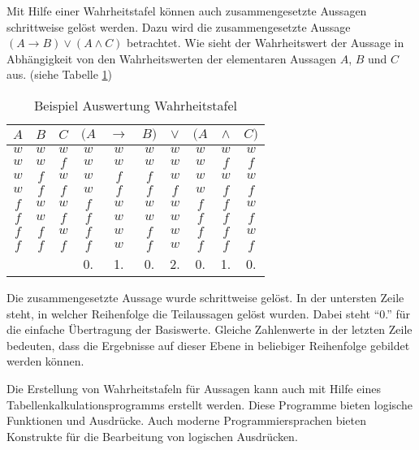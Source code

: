\begin{Unit}[Beispiel]
Mit Hilfe einer Wahrheitstafel können auch zusammengesetzte Aussagen 
schrittweise gelöst werden. Dazu wird die zusammengesetzte Aussage 
$(A \rightarrow B) \lor (A \land C)$ betrachtet. Wie sieht der Wahrheitswert 
der Aussage in Abhängigkeit von den Wahrheitswerten der elementaren Aussagen 
$A$, $B$ und $C$ aus. (siehe Tabelle 
\ref{tbl:Beispiel Auswertung Wahrheitstafel})

\begin{table}[htbp] 
\begin{center}
  \begin{tabular}{c|c|c||c|c|c|c|c|c|c|}
    $A$ & $B$ & $C$ & $(A$ & $\rightarrow$ & $B)$ & $\lor$ & $(A$ & $\land$ 
      & $C)$ \\ \hline
    $w$ & $w$ & $w$ & $w$ & $w$ & $w$ & $w$ & $w$ & $w$ & $w$ \\
    $w$ & $w$ & $f$ & $w$ & $w$ & $w$ & $w$ & $w$ & $f$ & $f$ \\
    $w$ & $f$ & $w$ & $w$ & $f$ & $f$ & $w$ & $w$ & $w$ & $w$ \\
    $w$ & $f$ & $f$ & $w$ & $f$ & $f$ & $f$ & $w$ & $f$ & $f$ \\
    $f$ & $w$ & $w$ & $f$ & $w$ & $w$ & $w$ & $f$ & $f$ & $w$ \\
    $f$ & $w$ & $f$ & $f$ & $w$ & $w$ & $w$ & $f$ & $f$ & $f$ \\
    $f$ & $f$ & $w$ & $f$ & $w$ & $f$ & $w$ & $f$ & $f$ & $w$ \\
    $f$ & $f$ & $f$ & $f$ & $w$ & $f$ & $w$ & $f$ & $f$ & $f$ \\ \hline
      &   &   & 0.& 1.& 0.& 2.& 0.& 1.& 0.\\
  \end{tabular}
  \caption{Beispiel Auswertung Wahrheitstafel}
  \label{tbl:Beispiel Auswertung Wahrheitstafel}
\end{center} 
\end{table}
\end{Unit}

\begin{Unit}[Anmerkung]
Die zusammengesetzte Aussage wurde schrittweise gelöst. In der untersten 
Zeile steht, in welcher Reihenfolge die Teilaussagen gelöst wurden. Dabei 
steht \enquote{0.} für die einfache Übertragung der Basiswerte. Gleiche 
Zahlenwerte in der letzten Zeile bedeuten, dass die Ergebnisse auf dieser 
Ebene in beliebiger Reihenfolge gebildet werden können.

Die Erstellung von Wahrheitstafeln für Aussagen kann auch mit Hilfe eines
Tabellenkalkulationsprogramms erstellt werden. Diese Programme bieten 
logische Funktionen und Ausdrücke. Auch moderne Programmiersprachen bieten
Konstrukte für die Bearbeitung von logischen Ausdrücken.
\end{Unit}

